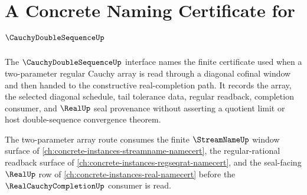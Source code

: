 \chapter{A Concrete Naming Certificate for $\CauchyDoubleSequenceUp$}
\label{ch:concrete-instances-cauchy-double-sequence-namecert}

The $\CauchyDoubleSequenceUp$ interface names the finite certificate used when a two-parameter regular Cauchy array is read through a diagonal cofinal window and then handed to the constructive real-completion path. It records the array, the selected diagonal schedule, tail tolerance data, regular readback, completion consumer, and $\RealUp$ seal provenance without asserting a quotient limit or host double-sequence convergence theorem.

The two-parameter array route consumes the finite $\StreamNameUp$ window surface of \autoref{ch:concrete-instances-streamname-namecert}, the regular-rational readback surface of \autoref{ch:concrete-instances-regseqrat-namecert}, and the seal-facing $\RealUp$ row of \autoref{ch:concrete-instances-real-namecert} before the $\RealCauchyCompletionUp$ consumer is read.

